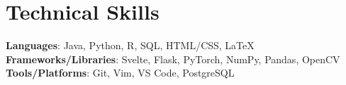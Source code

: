 \documentclass[letterpaper,10pt]{article}
\begin{document}


\section{Technical Skills}
 \begin{itemize}[leftmargin=0.15in, label={}]
    \small{\item{
     \textbf{Languages}{: Java, Python, R, SQL, HTML/CSS, \LaTeX} \\
     
    \textbf{Frameworks/Libraries}{: Svelte, Flask, PyTorch, NumPy, Pandas, OpenCV}\\
    \textbf{Tools/Platforms}{: Git, Vim, VS Code, PostgreSQL}
    }}
 \end{itemize}


\end{document}
